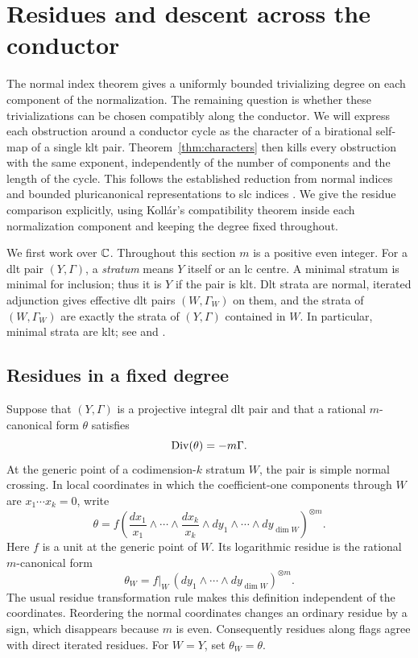 \section{Residues and descent across the conductor}\label{sec:residues}

The normal index theorem gives a uniformly bounded trivializing degree on
each component of the normalization.  The remaining question is whether
these trivializations can be chosen compatibly along the conductor.  We
will express each obstruction around a conductor cycle as the character
of a birational self-map of a single klt pair.  Theorem~\ref{thm:characters}
then kills every obstruction with the same exponent, independently of
the number of components and the length of the cycle.
This follows the established reduction from normal indices and bounded
pluricanonical representations to slc indices
\citep[Theorem~1.11]{Xu2019}.  We give the residue comparison explicitly,
using Koll\'ar's compatibility theorem inside each normalization component
and keeping the degree fixed throughout.

We first work over $\mathbb C$.  Throughout this section $m$ is a positive even
integer.  For a dlt pair $(Y,\Gamma)$, a \emph{stratum} means $Y$ itself
or an lc centre.  A minimal stratum is minimal for inclusion; thus it is
$Y$ if the pair is klt.  Dlt strata are normal, iterated adjunction gives
effective dlt pairs $(W,\Gamma_W)$ on them, and the strata of
$(W,\Gamma_W)$ are exactly the strata of $(Y,\Gamma)$ contained in $W$.
In particular, minimal strata are klt; see
\citep[Chapter~4]{Kollar2013} and \citep[Definition~4]{KollarSources}.

\subsection{Residues in a fixed degree}

Suppose that $(Y,\Gamma)$ is a projective integral dlt pair and that a
rational $m$-canonical form $\theta$ satisfies
\begin{equation}\label{res:form}
 \operatorname{Div}(\theta)=-m\Gamma.
\end{equation}
At the generic point of a codimension-$k$ stratum $W$, the pair is simple
normal crossing.  In local coordinates in which the coefficient-one
components through $W$ are $x_1\cdots x_k=0$, write
\[
 \theta=f\left(
 \frac{dx_1}{x_1}\wedge\cdots\wedge\frac{dx_k}{x_k}
 \wedge dy_1\wedge\cdots\wedge dy_{\dim W}
 \right)^{\otimes m}.
\]
Here $f$ is a unit at the generic point of $W$.  Its logarithmic residue
is the rational $m$-canonical form
\[
 \theta_W=f|_W\,(dy_1\wedge\cdots\wedge dy_{\dim W})^{\otimes m}.
\]
The usual residue transformation rule makes this definition independent
of the coordinates.  Reordering the normal coordinates changes an
ordinary residue by a sign, which disappears because $m$ is even.
Consequently residues along flags agree with direct iterated residues.
For $W=Y$, set $\theta_W=\theta$.


